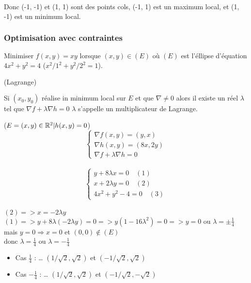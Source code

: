 	Donc (-1, -1) et (1, 1) sont des points cols, (-1, 1) est un maximum local, et (1, -1) est un minimum local.
	
	
		\subsubsection{Optimisation avec contraintes}
		
		Minimiser $f(x, y) = xy$ lorsque $(x, y) \in (E)$ où $(E)$ est l'éllipse d'équation $4x^2+y^2=4$ ($x^2/1^2 + y^2/2^2 = 1$).
		
		\begin{theoreme} (Lagrange)
		
		Si $(x_0, y_0)$ réalise in minimum local sur $E$ et que $\nabla \neq 0$ alors il existe un réel $\lambda$ tel que $\nabla f + \lambda \nabla h = 0 $
		$\lambda$ s'appelle un multiplicateur de Lagrange.
		\end{theoreme}
		
		($E = {(x, y) \in \mathbb{R}^2 | h(x, y) = 0}$)\\
		\[\begin{cases} \nabla f(x, y) = ( y, x) \\ \nabla h(x, y) = (8x, 2y)\\ \nabla f + \lambda \nabla h = 0 \end{cases} \] \\
		\[\begin{cases} y+8\lambda x=0 \quad(1) \\ x+2\lambda y=0 \quad(2) \\ 4x^2+y^2-4=0 \quad(3)\end{cases}\] \\
		$(2) => x = -2\lambda y$ \\
		$(1) => y+8\lambda (-2\lambda y) = 0 => y(1-16 \lambda^2) = 0 => y=0$ ou $\lambda = \pm \frac{1}{4}$ \\
		mais $y=0 \Rightarrow x=0$ et $(0, 0) \not \in (E)$ \\
		donc $\lambda = \frac{1}{4}$ ou $\lambda = -\frac{1}{4}$
		
		\begin{itemize}
		\item Cas $\frac{1}{4}$ : 
		\dots
		$(1/ \sqrt{2}, \sqrt{2})$ et $(-1/ \sqrt{2}, \sqrt{2})$
		\item Cas $-\frac{1}{4}$ : 
		\dots
		$(1/ \sqrt{2}, \sqrt{2})$ et $(-1/ \sqrt{2}, -\sqrt{2})$
		\end{itemize}
		
